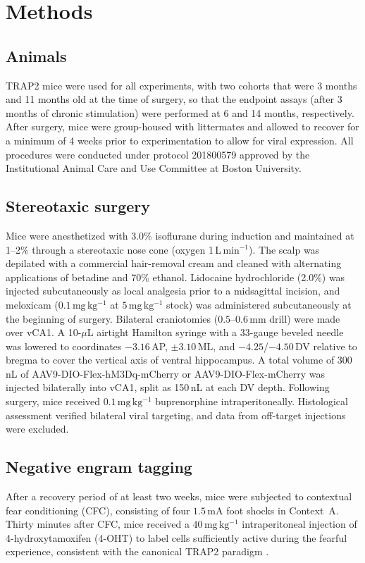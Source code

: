 \documentclass[11pt]{article}
\begin{document}
\section{Methods}

\subsection{Animals}
TRAP2 mice were used for all experiments, with two cohorts that were 3 months and 11 months old at the time of surgery, so that the endpoint assays (after 3 months of chronic stimulation) were performed at 6 and 14 months, respectively. After surgery, mice were group-housed with littermates and allowed to recover for a minimum of 4 weeks prior to experimentation to allow for viral expression. All procedures were conducted under protocol 201800579 approved by the Institutional Animal Care and Use Committee at Boston University.

\subsection{Stereotaxic surgery}
Mice were anesthetized with 3.0\% isoflurane during induction and maintained at 1--2\% through a stereotaxic nose cone (oxygen 1\,L\,min$^{-1}$). The scalp was depilated with a commercial hair-removal cream and cleaned with alternating applications of betadine and 70\% ethanol. Lidocaine hydrochloride (2.0\%) was injected subcutaneously as local analgesia prior to a midsagittal incision, and meloxicam ($0.1\,\mathrm{mg\,kg^{-1}}$ at $5\,\mathrm{mg\,kg^{-1}}$ stock) was administered subcutaneously at the beginning of surgery. Bilateral craniotomies ($0.5$--$0.6\,\mathrm{mm}$ drill) were made over vCA1. A 10-$\mu$L airtight Hamilton syringe with a 33-gauge beveled needle was lowered to coordinates $-3.16$\,AP, $\pm 3.10$\,ML, and $-4.25$/$-4.50$\,DV relative to bregma to cover the vertical axis of ventral hippocampus. A total volume of 300\,nL of AAV9-DIO-Flex-hM3Dq-mCherry or AAV9-DIO-Flex-mCherry was injected bilaterally into vCA1, split as 150\,nL at each DV depth. Following surgery, mice received $0.1\,\mathrm{mg\,kg^{-1}}$ buprenorphine intraperitoneally. Histological assessment verified bilateral viral targeting, and data from off-target injections were excluded.

\subsection{Negative engram tagging}
After a recovery period of at least two weeks, mice were subjected to contextual fear conditioning (CFC), consisting of four $1.5\,\mathrm{mA}$ foot shocks in Context~A. Thirty minutes after CFC, mice received a $40\,\mathrm{mg\,kg^{-1}}$ intraperitoneal injection of 4-hydroxytamoxifen (4-OHT) to label cells sufficiently active during the fearful experience, consistent with the canonical TRAP2 paradigm \citep{denardo2019temporal}.
\end{document}
